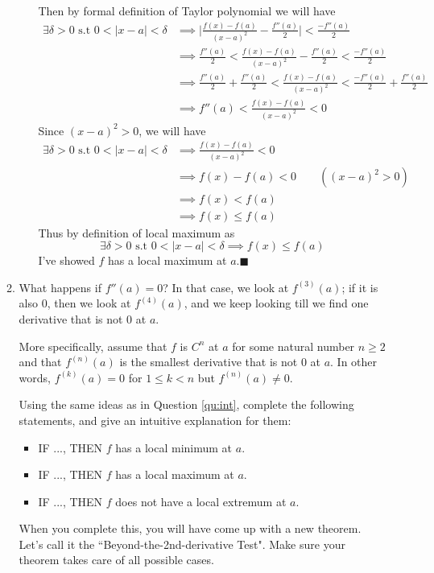 \documentclass[12pt]{exam}
\begin{document}
\begin{enumerate}
\begin{enumerate}
\begin{itemize}
			        Then by formal definition of Taylor polynomial we will have
			        \begin{align*}
			            \exists\delta>0 \mbox{ s.t } 0<\vert{x-a}\vert<\delta&\implies\vert{\frac{f(x)-f(a)}{(x-a)^2}-\frac{f''(a)}{2}}\vert<\frac{-f''(a)}{2}\\
			            &\implies\frac{f''(a)}{2}<\frac{f(x)-f(a)}{(x-a)^2}-\frac{f''(a)}{2}<\frac{-f''(a)}{2}\\
			            &\implies\frac{f''(a)}{2}+\frac{f''(a)}{2}<\frac{f(x)-f(a)}{(x-a)^2}<\frac{-f''(a)}{2}+\frac{f''(a)}{2}\\
			            &\implies f''(a)<\frac{f(x)-f(a)}{(x-a)^2}<0
			        \end{align*}
			        Since $(x-a)^2>0$, we will have
			        \begin{align*}
			            \exists\delta>0 \mbox{ s.t } 0<\vert{x-a}\vert<\delta
			            &\implies\frac{f(x)-f(a)}{(x-a)^2}<0\\
			            &\implies f(x)-f(a)<0\qquad((x-a)^2>0)\\
			            &\implies f(x)<f(a)\\
			            &\implies f(x)\leq f(a)
			        \end{align*}
			        Thus by definition of local maximum as
			        $$
			            \exists\delta>0 \mbox{ s.t } 0<\vert{x-a}\vert<\delta\implies f(x)\leq f(a)
			        $$
			        I've showed $f$ has a local maximum at $a$.\qquad $\blacksquare$
			\end{itemize}
			
			\newpage
	
		\item \label{qu:conj} What happens if $f''(a)=0$?     In that case, we look at $f^{(3)}(a)$;  if it is also $0$, then we look at $f^{(4)}(a)$, and we keep looking till we find one derivative that is not $0$ at $a$.   
		
		More specifically, assume that $f$ is $C^n$ at $a$ for some natural number $n \geq 2$ and that $f^{(n)}(a)$ is the smallest derivative  that is not $0$ at $a$.   In other words, $f^{(k)}(a) =0$ for $ 1 \leq k < n$ but $f^{(n)}(a) \neq 0$.
		
		Using the same ideas as in Question \ref{qu:int}, complete the following statements, and give an intuitive explanation for them:
			\begin{itemize}
				\item  IF ..., THEN $f$ has a local minimum at $a$.
				\item  IF ..., THEN $f$ has a local maximum at $a$.
				\item  IF ..., THEN $f$ does not have a local extremum at $a$.
			\end{itemize}
		When you complete this, you will have come up with a new theorem.  Let's call it the ``Beyond-the-2nd-derivative Test".   Make sure your theorem takes care of all possible cases.  
		

\end{enumerate}
\end{enumerate}
\end{document}
